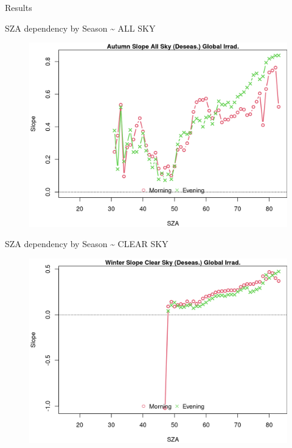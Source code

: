 \documentclass[
  ignorenonframetext,
]{beamer}
\begin{document}
\begin{frame}{Results}
\begin{block}{SZA dependency by Season \textasciitilde{} ALL SKY}
\begin{figure}
\begin{minipage}[t]{0.50\linewidth}
{\centering 

\includegraphics[width=4.48in,height=\textheight]{images/DHI_GHI_2_sza_trends_files/figure-html/szatrendsseas-96.png}

}

\end{minipage}%

\end{figure}
\end{block}

\begin{block}{SZA dependency by Season \textasciitilde{} CLEAR SKY}
\protect\hypertarget{sza-dependency-by-season-clear-sky}{}
\begin{figure}

\begin{minipage}[t]{0.50\linewidth}

{\centering 

\includegraphics[width=4.48in,height=\textheight]{images/DHI_GHI_2_sza_trends_files/figure-html/szatrendsseas-21.png}

}
\end{minipage}
\end{figure}
\end{block}
\end{frame}
\end{document}
